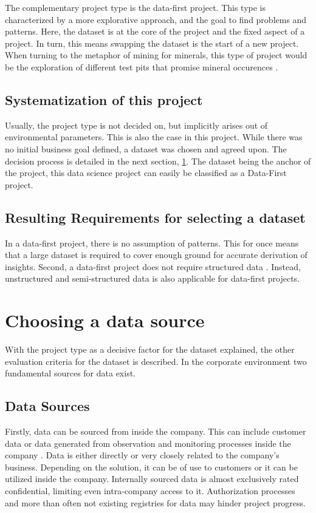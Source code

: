 	The complementary project type is the data-first project. This type is characterized by a more explorative approach, and the goal to find problems and patterns. Here, the dataset is at the core of the project and the fixed aspect of a project. In turn, this means swapping the dataset is the start of a new project. When turning to the metaphor of mining for minerals, this type of project would be the exploration of different test pits that promise mineral occurences \cite{dataScienceProjectTypes}.
	
	\subsection{Systematization of this project}
	Usually, the project type is not decided on, but implicitly arises out of environmental parameters. This is also the case in this project. While there was no initial business goal defined, a dataset was chosen and agreed upon. The decision process is detailed in the next section, \ref{data-source}. The dataset being the anchor of the project, this data science project can easily be classified as a Data-First project.
	
	\subsection{Resulting Requirements for selecting a dataset}
	In a data-first project, there is no assumption of patterns. This for once means that a large dataset is required to cover enough ground for accurate derivation of insights. Second, a data-first project does not require structured data \cite{srivastavaDataMining}. Instead, unstructured and semi-structured data is also applicable for data-first projects.
	
	\section{Choosing a data source}
	\label{data-source}
	
	With the project type as a decisive factor for the dataset explained, the other evaluation criteria for the dataset is described. In the corporate environment two fundamental sources for data exist. 
	
	\subsection{Data Sources}
	Firstly, data can be sourced from inside the company. This can include customer data or data generated from observation and monitoring processes inside the company \cite{internalExternalData}. Data is either directly or very closely related to the company's business. Depending on the solution, it can be of use to customers or it can be utilized inside the company. Internally sourced data is almost exclusively rated confidential, limiting even intra-company access to it. Authorization processes and more than often not existing registries for data may hinder project progress.
	
